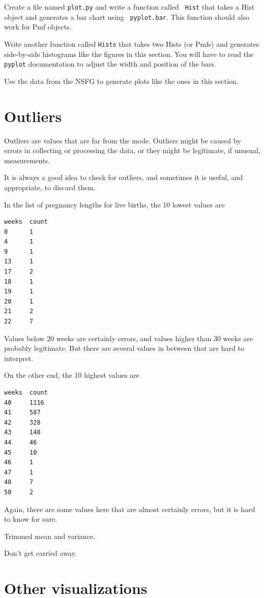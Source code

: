 \documentclass[12pt]{book}
\begin{document}
\begin{ex}

Create a file named {\tt plot.py} and write a function called {\tt
  Hist} that takes a Hist object and generates a bar chart using {\tt
  pyplot.bar}.  This function should also work for Pmf objects.

Write another function called {\tt Hists} that takes two Hists (or
Pmfs) and generates side-by-side histograms like the figures in this
section.  You will have to read the {\tt pyplot} documentation to
adjust the width and position of the bars.

Use the data from the NSFG to generate plots like the ones in this
section.
\end{ex}


\section{Outliers}

Outliers are values that are far from the mode.  Outliers might
be caused by errors in collecting or processing the data, or
they might be legitimate, if unusual, measurements.

It is always a good idea to check for outliers, and sometimes
it is useful, and appropriate, to discard them.

In the list of pregnancy lengths for live births, the 10 lowest values are

\begin{verbatim}
weeks  count
0      1
4      1
9      1
13     1
17     2
18     1
19     1
20     1
21     2
22     7
\end{verbatim}

Values below 20 weeks are certainly errors, and values higher than 30
weeks are probably legitimate.  But there are several values in
between that are hard to interpret.

On the other end, the 10 highest values are

\begin{verbatim}
weeks  count
40     1116
41     587
42     328
43     148
44     46
45     10
46     1
47     1
48     7
50     2
\end{verbatim}

Again, there are some values here that are almost certainly errors, but
it is hard to know for sure.

Trimmed mean and variance.

Don't get carried away.


\section{Other visualizations}
\end{document}
